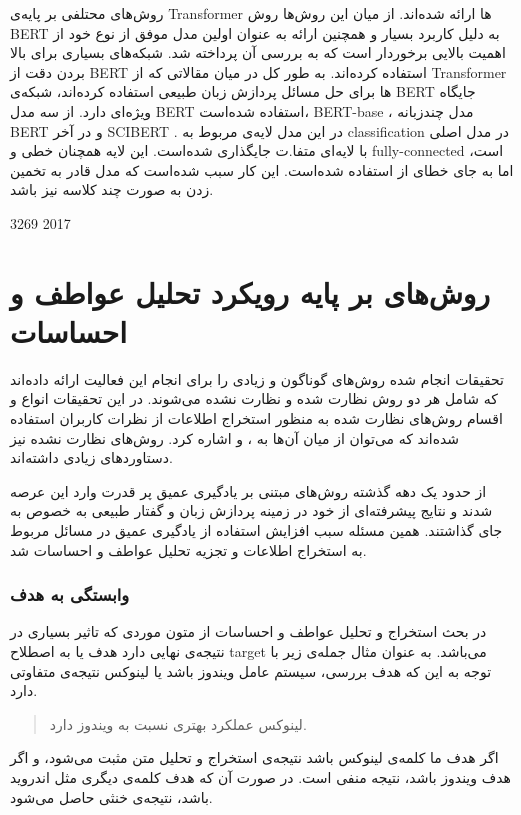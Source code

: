 \documentclass[12pt, a4paper, oneside]{report}
\begin{document}
روش‌های محتلفی بر پایه‌ی
Transformer
ها ارائه شده‌اند. از میان این روش‌ها روش
BERT
به دلیل کاربرد بسیار و همچنین ارائه به عنوان اولین مدل موفق از نوع خود از اهمیت بالایی برخوردار است که به بررسی آن
پرداخته شد. شبکه‌های بسیاری برای بالا بردن دقت از
BERT
استفاده کرده‌اند. به طور کل در میان مقالاتی که از
Transformer
ها برای حل مسائل پردازش زبان طبیعی استفاده کرده‌اند، شبکه‌ی
BERT
جایگاه ویژه‌ای دارد.
\cite{schmidt2020data}
از سه مدل
BERT
استفاده شده‌است،
BERT-base
، مدل چندزبانه
BERT
و در آخر
SCIBERT
.
در این مدل لایه‌ی مربوط به
classification
در مدل اصلی با لایه‌ای متفا.ت جایگذاری شده‌است. این لایه همچنان خطی و
fully-connected
است، اما به جای خطای
از
استفاده شده‌است. این کار سبب شده‌است که مدل قادر به تخمین زدن به صورت چند کلاسه نیز باشد.

\cite{yang-etal-2016-hierarchical} 3269 2017


\section{روش‌های بر پایه رویکرد تحلیل عواطف و احساسات}

تحقیقات انجام شده روش‌های گوناگون و زیادی را برای انجام این فعالیت ارائه داده‌اند که شامل هر دو روش
نظارت شده و نظارت نشده می‌شوند.
در این تحقیقات انواع و اقسام روش‌های نظارت شده به منظور استخراج اطلاعات از نظرات کاربران
استفاده شده‌اند که می‌توان از میان آن‌ها به
،
و
اشاره کرد.
روش‌های نظارت نشده نیز دستاورد‌های زیادی داشته‌اند.

از حدود یک دهه گذشته روش‌های مبتنی بر یادگیری عمیق پر قدرت وارد این عرصه شدند و نتایج پیشرفته‌ای
از خود در زمینه پردازش زبان و گفتار طبیعی به خصوص
به جای گذاشتند.
همین مسئله سبب افزایش استفاده از یادگیری عمیق در مسائل مربوط به استخراج اطلاعات و تجزیه تحلیل
عواطف و احساسات شد.
\cite{zhang2018deep}


\subsubsection{وابستگی به هدف}
در بحث استخراج و تحلیل عواطف و احساسات از متون موردی که تاثیر بسیاری در نتیجه‌ی نهایی دارد هدف یا به اصطلاح
target
می‌باشد. به عنوان مثال جمله‌ی زیر با توجه به این که هدف بررسی، سیستم عامل ویندوز باشد یا لینوکس نتیجه‌ی متفاوتی دارد.
\begin{quotation}
    لینوکس عملکرد بهتری نسبت به ویندوز دارد.
\end{quotation}
اگر هدف ما کلمه‌ی لینوکس باشد نتیجه‌ی استخراج و تحلیل متن مثبت می‌شود، و اگر هدف ویندوز باشد، نتیجه منفی است.
در صورت آن که هدف کلمه‌ی دیگری مثل اندروید باشد، نتیجه‌ی خنثی حاصل می‌شود.
\end{document}

